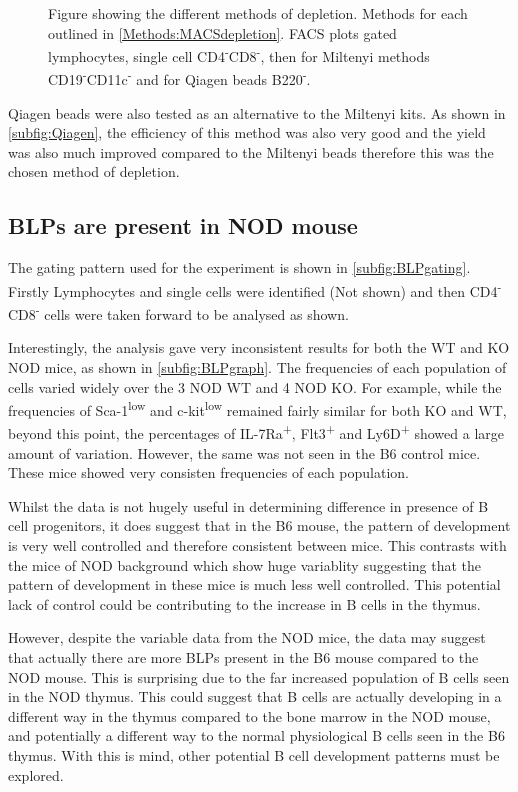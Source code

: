 \begin{figure}
\caption{Figure showing the different methods of depletion. 
Methods for each outlined in \cref{Methods:MACSdepletion}.
FACS plots gated lymphocytes, single cell CD4\textsuperscript{-}CD8\textsuperscript{-}, then for Miltenyi methods CD19\textsuperscript{-}CD11c\textsuperscript{-} and for Qiagen beads B220\textsuperscript{-}.}
\end{figure}

Qiagen beads were also tested as an alternative to the Miltenyi kits. 
As shown in \cref{subfig:Qiagen}, the efficiency of this method was also very good and the yield was also much improved compared to the Miltenyi beads therefore this was the chosen method of depletion.


\subsection{BLPs are present in NOD mouse}

The gating pattern used for the experiment is shown in \cref{subfig:BLPgating}.
Firstly Lymphocytes and single cells were identified (Not shown) and then CD4\textsuperscript{-}CD8\textsuperscript{-} cells were taken forward to be analysed as shown.

Interestingly, the analysis gave very inconsistent results for both the WT and KO NOD mice, as shown in \cref{subfig:BLPgraph}.
The frequencies of each population of cells varied widely over the 3 NOD WT and 4 NOD KO. 
For example, while the frequencies of Sca-1\textsuperscript{low} and c-kit\textsuperscript{low} remained fairly similar for both KO and WT, beyond this point, the percentages of IL-7Ra\textsuperscript{+}, Flt3\textsuperscript{+} and Ly6D\textsuperscript{+} showed a large amount of variation.
However, the same was not seen in the B6 control mice.
These mice showed very consisten frequencies of each population.

Whilst the data is not hugely useful in determining difference in presence of B cell progenitors, it does suggest that in the B6 mouse, the pattern of development is very well controlled and therefore consistent between mice.
This contrasts with the mice of NOD background which show huge variablity suggesting that the pattern of development in these mice is much less well controlled.
This potential lack of control could be contributing to the increase in B cells in the thymus.

However, despite the variable data from the NOD mice, the data may suggest that actually there are more BLPs present in the B6 mouse compared to the NOD mouse.
This is surprising due to the far increased population of B cells seen in the NOD thymus.
This could suggest that B cells are actually developing in a different way in the thymus compared to the bone marrow in the NOD mouse, and potentially a different way to the normal physiological B cells seen in the B6 thymus.
With this is mind, other potential B cell development patterns must be explored.


